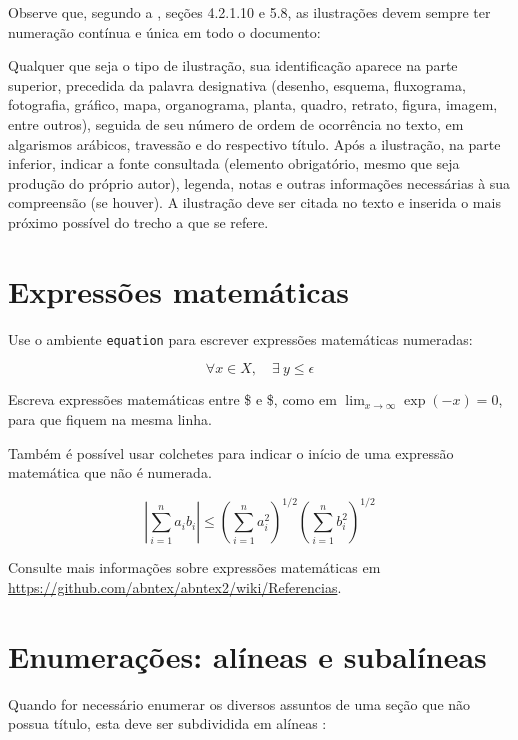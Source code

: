 Observe que, segundo a \cite{NBR14724:2011}, seções 4.2.1.10 e 5.8, as
ilustrações devem sempre ter numeração contínua e única em todo o documento:

\begin{citacao}
Qualquer que seja o tipo de ilustração, sua identificação aparece na parte
superior, precedida da palavra designativa (desenho, esquema, fluxograma,
fotografia, gráfico, mapa, organograma, planta, quadro, retrato, figura,
imagem, entre outros), seguida de seu número de ordem de ocorrência no texto,
em algarismos arábicos, travessão e do respectivo título. Após a ilustração, na
parte inferior, indicar a fonte consultada (elemento obrigatório, mesmo que
seja produção do próprio autor), legenda, notas e outras informações
necessárias à sua compreensão (se houver). A ilustração deve ser citada no
texto e inserida o mais próximo possível do trecho a que se
refere. \cite[seções 5.8]{NBR14724:2011}
\end{citacao}

\section{Expressões matemáticas}

Use o ambiente \texttt{equation} para escrever
expressões matemáticas numeradas:

\begin{equation}
  \forall x \in X, \quad \exists \: y \leq \epsilon
\end{equation}

Escreva expressões matemáticas entre \$ e \$, como em $ \lim_{x \to \infty}
\exp(-x) = 0 $, para que fiquem na mesma linha.

Também é possível usar colchetes para indicar o início de uma expressão
matemática que não é numerada.

\[
\left|\sum_{i=1}^n a_ib_i\right|
\le
\left(\sum_{i=1}^n a_i^2\right)^{1/2}
\left(\sum_{i=1}^n b_i^2\right)^{1/2}
\]

Consulte mais informações sobre expressões matemáticas em
\url{https://github.com/abntex/abntex2/wiki/Referencias}.

\section{Enumerações: alíneas e subalíneas}

Quando for necessário enumerar
os diversos assuntos de uma seção que não possua título, esta deve ser
subdividida em alíneas \cite[4.2]{NBR6024:2012}:

